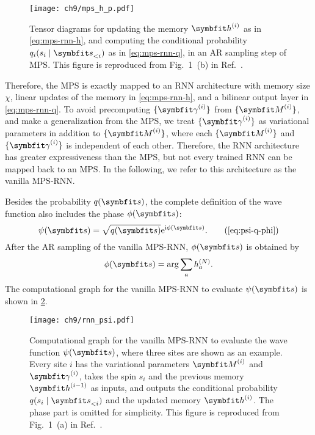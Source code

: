 \begin{figure}[htb]
\centering
\texttt{[image: ch9/mps\_h\_p.pdf]}
\caption[Tensor diagrams for an AR sampling step of MPS]{
Tensor diagrams for updating the memory $\vh^{(i)}$ as in \cref{eq:mps-rnn-h}, and computing the conditional probability $q_i(s_i \mid \vs_{< i})$ as in \cref{eq:mps-rnn-q}, in an AR sampling step of MPS.
This figure is reproduced from Fig.~1~(b) in Ref.~\cite{wu2023tensor}.
}
\label{fig:mps-h-p}
\end{figure}

Therefore, the MPS is exactly mapped to an RNN architecture with memory size $\chi$, linear updates of the memory in \cref{eq:mps-rnn-h}, and a bilinear output layer in \cref{eq:mps-rnn-q}. To avoid precomputing $\{\mga^{(i)}\}$ from $\{\mM^{(i)}\}$, and make a generalization from the MPS, we treat $\{\mga^{(i)}\}$ as variational parameters in addition to $\{\mM^{(i)}\}$, where each $\{\mM^{(i)}\}$ and $\{\mga^{(i)}\}$ is independent of each other. Therefore, the RNN architecture has greater expressiveness than the MPS, but not every trained RNN can be mapped back to an MPS. In the following, we refer to this architecture as the vanilla MPS-RNN.

Besides the probability $q(\vs)$, the complete definition of the wave function also includes the phase $\phi(\vs)$:
\begin{equation}
\psi(\vs) = \sqrt{q(\vs)} \rme^{\rmi \phi(\vs)}.
\tag{\ref{eq:psi-q-phi}}
\end{equation}
After the AR sampling of the vanilla MPS-RNN, $\phi(\vs)$ is obtained by
\begin{equation}
\phi(\vs) = \arg \sum_{a} h^{(N)}_a.
\label{eq:mps-rnn-phase}
\end{equation}
The computational graph for the vanilla MPS-RNN to evaluate $\psi(\vs)$ is shown in \cref{fig:rnn-psi}.

\begin{figure}[htb]
\centering
\texttt{[image: ch9/rnn\_psi.pdf]}
\caption[Computational graph for vanilla MPS-RNN]{
Computational graph for the vanilla MPS-RNN to evaluate the wave function $\psi(\vs)$, where three sites are shown as an example.
Every site $i$ has the variational parameters $\mM^{(i)}$ and $\mga^{(i)}$, takes the spin $s_i$ and the previous memory $\vh^{(i - 1)}$ as inputs, and outputs the conditional probability $q(s_i \mid \vs_{< i})$ and the updated memory $\vh^{(i)}$.
The phase part is omitted for simplicity.
This figure is reproduced from Fig.~1~(a) in Ref.~\cite{wu2023tensor}.
}
\label{fig:rnn-psi}
\end{figure}

